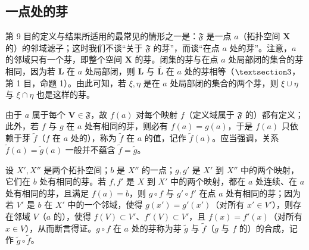 \subsection{一点处的芽}

第 9 目的定义与结果所适用的最常见的情形之一是：\(\mathfrak{F}\) 是一点 \(a\)（拓扑空间 \(\mathbf{X}\) 的）的邻域滤子；这时我们不谈“关于 \(\mathfrak{F}\) 的芽”，而谈“在点 \(a\) 处的芽”。注意，\(a\) 的邻域只有一个芽，即整个空间 \(\mathbf{X}\) 的芽。闭集的芽与在点 \(a\) 处局部闭的集合的芽相同，因为若 \(\mathbf{L}\) 在 \(a\) 处局部闭，则 \(\mathbf{L}\) 与 \(\overline{\mathbf{L}}\) 在 \(a\) 处的芽相等（\(\S 3\)，第 1 目，命题 1）。由此可知，若 \(\xi, \eta\) 是在 \(a\) 处局部闭的集合的两个芽，则 \(\xi \cup \eta\) 与 \(\xi \cap \eta\) 也是这样的芽。

由于 \(a\) 属于每个 \(\mathbf{V} \in \mathfrak{F}\)，故 \(f(a)\) 对每个映射 \(f\)（定义域属于 \(\mathfrak{F}\) 的）都有定义；此外，若 \(f\) 与 \(g\) 在 \(a\) 处有相同的芽，则必有 \(f(a) = g(a)\)，于是 \(f(a)\) 只依赖于芽 \(\tilde{f}\)（\(f\) 在 \(a\) 处的），称为 \(\tilde{f}\) 在 \(a\) 的值，记作 \(\tilde{f}(a)\)。应当强调，关系 \(\tilde{f}(a) = \tilde{g}(a)\) 一般并不蕴含 \(\tilde{f} = \tilde{g}\)。

设 \(X', X''\) 是两个拓扑空间；\(b\) 是 \(X''\) 的一点；\(g, g'\) 是 \(X'\) 到 \(X''\) 中的两个映射，它们在 \(b\) 处有相同的芽。若 \(f, f'\) 是 \(X\) 到 \(X'\) 中的两个映射，都在 \(a\) 处连续、在 \(a\) 处有相同的芽，且满足 \(f(a) = b\)，则 \(g \circ f\) 与 \(g' \circ f'\) 在点 \(a\) 处有相同的芽；因为若 \(V'\) 是 \(b\) 在 \(X'\) 中的一个邻域，使得 \(g(x') = g'(x')\)（对所有 \(x' \in V'\)），则存在邻域 \(V\)（\(a\) 的），使得 \(f(V) \subset V'\)、\(f'(V) \subset V'\)，且 \(f(x) = f'(x)\)（对所有 \(x \in V\)），从而断言得证。\(g \circ f\) 在 \(a\) 处的芽称为芽 \(\tilde{g}\) 与 \(\tilde{f}\)（\(g\) 与 \(f\) 的）的合成，记作 \(\tilde{g} \circ \tilde{f}\)。

